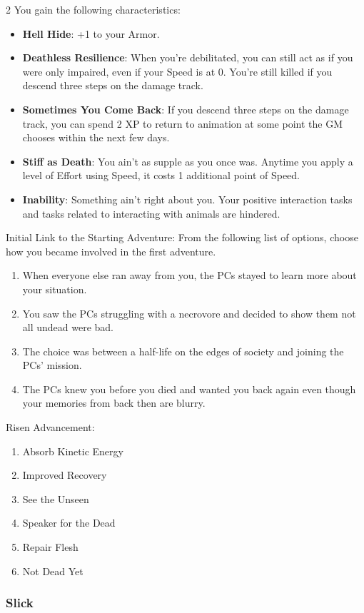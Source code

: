 \begin{multicols}{2}
You gain the following characteristics: 
\begin{itemize}
\item \textbf{Hell Hide}: +1 to your Armor. 
\item \textbf{Deathless Resilience}: When you’re debilitated, you can still act as if you were only impaired, even if your Speed is at 0. You’re still killed if you descend three steps on the damage track. 
\item \textbf{Sometimes You Come Back}: If you descend three steps on the damage track, you can spend 2 XP to return to animation at some point the GM chooses within the next few days. 
\item \textbf{Stiff as Death}: You ain’t as supple as you once was. Anytime you apply a level of Effort using Speed, it costs 1 additional point of Speed. 
\item \textbf{Inability}: Something ain’t right about you. Your positive interaction tasks and tasks related to interacting with animals are hindered. 
\end{itemize}

Initial Link to the Starting Adventure: From the following list of options, choose how you became involved in the first adventure. 
\begin{enumerate}
\item When everyone else ran away from you, the PCs stayed to learn more about your situation. 
\item You saw the PCs struggling with a necrovore and decided to show them not all undead were bad. 
\item The choice was between a half-life on the edges of society and joining the PCs’ mission. 
\item The PCs knew you before you died and wanted you back again even though your memories from back then are blurry.
\end{enumerate}

Risen Advancement: 
\begin{enumerate}
\item Absorb Kinetic Energy
\item Improved Recovery
\item See the Unseen
\item Speaker for the Dead
\item Repair Flesh 
\item Not Dead Yet 
\end{enumerate}

\subsubsection{Slick}


\end{multicols}
